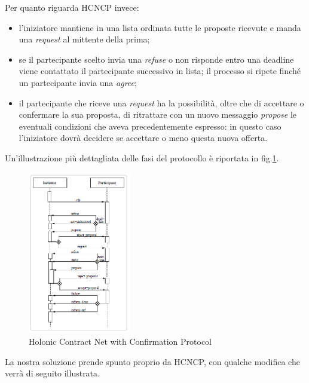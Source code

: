 \documentclass[a4paper, 10pt, conference]{ieeeconf} %
\begin{document}
Per quanto riguarda HCNCP invece:
\begin{itemize}
\item{l'iniziatore mantiene in una lista ordinata tutte le proposte ricevute e manda una \emph{request} al mittente della prima;}
\item{se il partecipante scelto invia una \emph{refuse} o non risponde entro una deadline viene contattato il partecipante successivo in lista; il processo si ripete finché un partecipante invia una \emph{agree};}
\item{il partecipante che riceve una \emph{request} ha la possibilità, oltre che di accettare o confermare la sua proposta, di ritrattare con un nuovo messaggio \emph{propose} le eventuali condizioni che aveva precedentemente espresso: in questo caso l'iniziatore dovrà decidere se accettare o meno questa nuova offerta.}
\end{itemize}
Un'illustrazione più dettagliata delle fasi del protocollo è riportata in fig.\ref{f3}.

\begin{figure}[t]
\centering
\includegraphics[width=0.4\textwidth]{hcncp.png}
\caption{Holonic Contract Net with Confirmation Protocol} \label{f3}
\end{figure}

La nostra soluzione prende spunto proprio da HCNCP, con qualche modifica che verrà di seguito illustrata.
\end{document}
